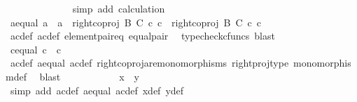 \begin{isabellebody}
\ \ \ \ \ \ \ \ \ \ \ \ \isamarkupfalse%
\ {\isacharparenleft}{\kern0pt}simp\ add{\isacharcolon}{\kern0pt}\ calculation{\isacharparenright}{\kern0pt}\isanewline
\ \ \ \ \ \ \ \ \isamarkupfalse%
\ \ \ \ \ \isanewline
\ \ \ \ \ \ \ \ \isamarkupfalse%
\ \isamarkupfalse%
\ a{\isacharunderscore}{\kern0pt}equal{\isacharcolon}{\kern0pt}\ {\isachardoublequoteopen}a\ {\isacharequal}{\kern0pt}\ a{\isacharprime}{\kern0pt}\ {\isasymand}\ right{\isacharunderscore}{\kern0pt}coproj\ B\ C\ {\isasymcirc}\isactrlsub c\ c\ {\isacharequal}{\kern0pt}\ right{\isacharunderscore}{\kern0pt}coproj\ B\ C\ {\isasymcirc}\isactrlsub c\ c{\isacharprime}{\kern0pt}{\isachardoublequoteclose}\isanewline
\ \ \ \ \ \ \ \ \ \ \isamarkupfalse%
\ a{\isacharprime}{\kern0pt}c{\isacharprime}{\kern0pt}{\isacharunderscore}{\kern0pt}def\ ac{\isacharunderscore}{\kern0pt}def\ element{\isacharunderscore}{\kern0pt}pair{\isacharunderscore}{\kern0pt}eq\ equal{\isacharunderscore}{\kern0pt}pair\ \isamarkupfalse%
\ {\isacharparenleft}{\kern0pt}typecheck{\isacharunderscore}{\kern0pt}cfuncs{\isacharcomma}{\kern0pt}\ blast{\isacharparenright}{\kern0pt}\isanewline
\ \ \ \ \ \ \ \ \isamarkupfalse%
\ \isamarkupfalse%
\ c{\isacharunderscore}{\kern0pt}equal{\isacharcolon}{\kern0pt}\ {\isachardoublequoteopen}c\ {\isacharequal}{\kern0pt}\ c{\isacharprime}{\kern0pt}{\isachardoublequoteclose}\ \isanewline
\ \ \ \ \ \ \ \ \ \ \isamarkupfalse%
\ a{\isacharprime}{\kern0pt}c{\isacharprime}{\kern0pt}{\isacharunderscore}{\kern0pt}def\ a{\isacharunderscore}{\kern0pt}equal\ ac{\isacharunderscore}{\kern0pt}def\ right{\isacharunderscore}{\kern0pt}coproj{\isacharunderscore}{\kern0pt}are{\isacharunderscore}{\kern0pt}monomorphisms\ right{\isacharunderscore}{\kern0pt}proj{\isacharunderscore}{\kern0pt}type\ monomorphism{\isacharunderscore}{\kern0pt}def{}\ \isamarkupfalse%
\ blast\isanewline
\ \ \ \ \ \ \ \ \isamarkupfalse%
\ \isamarkupfalse%
\ {\isachardoublequoteopen}x\ {\isacharequal}{\kern0pt}\ y{\isachardoublequoteclose}\isanewline
\ \ \ \ \ \ \ \ \ \ \isamarkupfalse%
\ {\isacharparenleft}{\kern0pt}simp\ add{\isacharcolon}{\kern0pt}\ a{\isacharprime}{\kern0pt}c{\isacharprime}{\kern0pt}{\isacharunderscore}{\kern0pt}def\ a{\isacharunderscore}{\kern0pt}equal\ ac{\isacharunderscore}{\kern0pt}def\ x{\isacharprime}{\kern0pt}{\isacharunderscore}{\kern0pt}def\ y{\isacharprime}{\kern0pt}{\isacharunderscore}{\kern0pt}def{\isacharparenright}{\kern0pt}\isanewline

\end{isabellebody}
